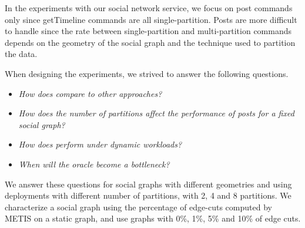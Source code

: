In the experiments with our social network service, we focus on post commands only since getTimeline commands are all single-partition.
Posts are more difficult to handle since the rate between single-partition and multi-partition commands depends on the geometry of the social graph and the technique used to partition the data.

When designing the experiments, we strived to answer the following questions.
\begin{itemize}
\item \emph{How does \dynastar compare to other approaches?} 
\item \emph{How does the number of partitions affect the performance of posts for a fixed social graph?}
\item \emph{How does \dynastar perform under dynamic workloads?}
\item \emph{When will the oracle become a bottleneck?}
\end{itemize}

We answer these questions for social graphs with different geometries and using deployments with different number of partitions, with 2, 4 and 8 partitions.
We characterize a social graph using the percentage of edge-cuts computed by METIS on a static graph, and use graphs with 0\%, 1\%, 5\% and 10\% of edge cuts.



